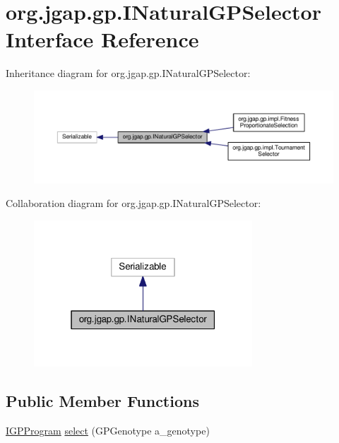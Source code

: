 \hypertarget{interfaceorg_1_1jgap_1_1gp_1_1_i_natural_g_p_selector}{\section{org.\-jgap.\-gp.\-I\-Natural\-G\-P\-Selector Interface Reference}
\label{interfaceorg_1_1jgap_1_1gp_1_1_i_natural_g_p_selector}
}


Inheritance diagram for org.\-jgap.\-gp.\-I\-Natural\-G\-P\-Selector\-:
\nopagebreak
\begin{figure}[H]
\begin{center}
\leavevmode
\includegraphics[width=350pt]{interfaceorg_1_1jgap_1_1gp_1_1_i_natural_g_p_selector__inherit__graph}
\end{center}
\end{figure}


Collaboration diagram for org.\-jgap.\-gp.\-I\-Natural\-G\-P\-Selector\-:
\nopagebreak
\begin{figure}[H]
\begin{center}
\leavevmode
\includegraphics[width=232pt]{interfaceorg_1_1jgap_1_1gp_1_1_i_natural_g_p_selector__coll__graph}
\end{center}
\end{figure}
\subsection*{Public Member Functions}
\begin{DoxyCompactItemize}
\item 
\hyperlink{interfaceorg_1_1jgap_1_1gp_1_1_i_g_p_program}{I\-G\-P\-Program} \hyperlink{interfaceorg_1_1jgap_1_1gp_1_1_i_natural_g_p_selector_a91cd59f0c5803bfc5dc680948db5cd90}{select} (G\-P\-Genotype a\-\_\-genotype)
\end{DoxyCompactItemize}

